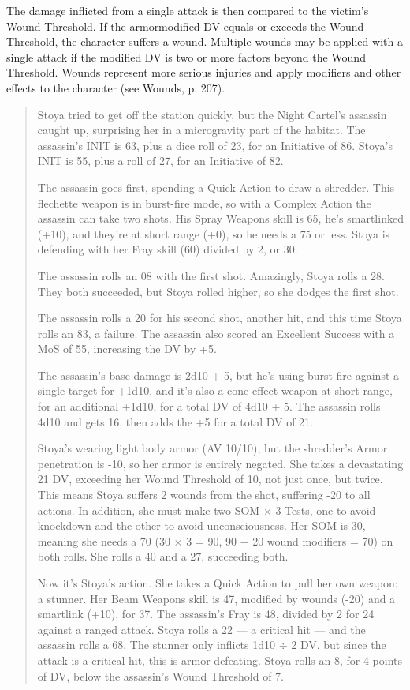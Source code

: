 The damage inflicted from a single attack is then compared to the victim’s Wound Threshold. If the armormodified DV equals or exceeds the Wound Threshold, the character suffers a wound. Multiple wounds may be applied with a single attack if the modified DV is two or more factors beyond the Wound Threshold. Wounds represent more serious injuries and apply modifiers and other effects to the character (see Wounds, p. 207). 

\begin{quotation} Stoya tried to get off the station quickly, but the Night Cartel’s assassin caught up, surprising her in a microgravity part of the habitat. The assassin’s INIT is 63, plus a dice roll of 23, for an Initiative of 86. Stoya’s INIT is 55, plus a roll of 27, for an Initiative of 82. 

The assassin goes first, spending a Quick Action to draw a shredder. This flechette weapon is in burst-fire mode, so with a Complex Action the assassin can take two shots. His Spray Weapons skill is 65, he’s smartlinked (+10), and they’re at short range (+0), so he needs a 75 or less. Stoya is defending with her Fray skill (60) divided by 2, or 30. 

The assassin rolls an 08 with the first shot. Amazingly, Stoya rolls a 28. They both succeeded, but Stoya rolled higher, so she dodges the first shot. 

The assassin rolls a 20 for his second shot, another hit, and this time Stoya rolls an 83, a failure. The assassin also scored an Excellent Success with a MoS of 55, increasing the DV by +5. 

The assassin’s base damage is 2d10 + 5, but he’s using burst fire against a single target for +1d10, and it’s also a cone effect weapon at short range, for an additional +1d10, for a total DV of 4d10 + 5. The assassin rolls 4d10 and gets 16, then adds the +5 for a total DV of 21. 

Stoya’s wearing light body armor (AV 10/10), but the shredder’s Armor penetration is -10, so her armor is entirely negated. She takes a devastating 21 DV, exceeding her Wound Threshold of 10, not just once, but twice. This means Stoya suffers 2 wounds from the shot, suffering -20 to all actions. In addition, she must make two SOM $\times$ 3 Tests, one to avoid knockdown and the other to avoid unconsciousness. Her SOM is 30, meaning she needs a 70 (30 $\times$ 3 = 90, 90 $-$ 20 wound modifiers = 70) on both rolls. She rolls a 40 and a 27, succeeding both. 

Now it’s Stoya’s action. She takes a Quick Action to pull her own weapon: a stunner. Her Beam Weapons skill is 47, modified by wounds (-20) and a smartlink (+10), for 37. The assassin’s Fray is 48, divided by 2 for 24 against a ranged attack. Stoya rolls a 22 --- a critical hit --- and the assassin rolls a 68. The stunner only inflicts 1d10 $\div$ 2 DV, but since the attack is a critical hit, this is armor defeating. Stoya rolls an 8, for 4 points of DV, below the assassin’s Wound Threshold of 7. 


\end{quotation}
